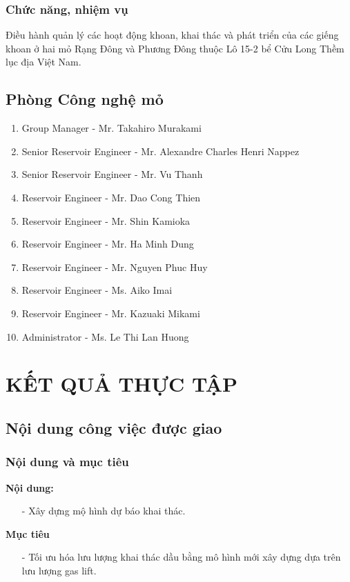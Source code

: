 \documentclass[12pt,a4paper]{report}
\begin{document}
\subsection{Chức năng, nhiệm vụ}
Điều hành quản lý các hoạt động khoan, khai thác và phát triển của các giếng khoan ở hai mỏ Rạng Đông và Phương Đông thuộc Lô 15-2 bể Cửu Long Thềm lục địa Việt Nam.
\section{Phòng Công nghệ mỏ}
	\begin{enumerate}
    	\item Group Manager - Mr. Takahiro Murakami
        \item Senior Reservoir Engineer - Mr. Alexandre Charles Henri Nappez
        \item Senior Reservoir Engineer - Mr. Vu Thanh
        \item Reservoir Engineer - Mr. Dao Cong Thien
        \item Reservoir Engineer - Mr. Shin Kamioka
        \item Reservoir Engineer - Mr. Ha Minh Dung
        \item Reservoir Engineer - Mr. Nguyen Phuc Huy
        \item Reservoir Engineer - Ms. Aiko Imai
        \item Reservoir Engineer - Mr. Kazuaki Mikami
        \item Administrator - Ms. Le Thi Lan Huong
    \end{enumerate}

\chapter{KẾT QUẢ THỰC TẬP}
\section{Nội dung công việc được giao}
\subsection{Nội dung và mục tiêu}
\textbf{Nội dung:}
	\begin{itemize}
    	\item[-] Xây dựng mộ hình dự báo khai thác.
	\end{itemize}
\textbf{Mục tiêu}
	\begin{itemize}
    	\item[-] Tối ưu hóa lưu lượng khai thác dầu bằng mô hình mới xây dựng dựa trên lưu lượng gas lift.
    \end{itemize}
\end{document}
